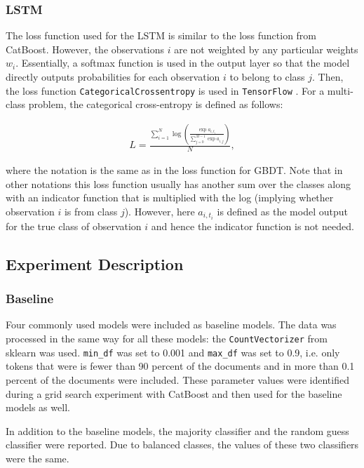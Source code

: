 \documentclass{article}
\begin{document}
	\subsubsection{LSTM}
	
	The loss function used for the LSTM is similar to the loss function from CatBoost. However, the observations $i$ are not weighted by any particular weights $w_i$. Essentially, a softmax function is used in the output layer so that the model directly outputs probabilities for each observation $i$ to belong to class $j$. Then, the loss function \lstinline{CategoricalCrossentropy} is used in \lstinline{TensorFlow} \cite{noauthor_module:_nodate}. For a multi-class problem, the categorical cross-entropy is defined as follows:
	
	\begin{align}
	L = \frac{\sum_{i = 1}^N \log \left(\frac{\exp a_{i, t_i}}{\sum_{j = 0}^{M-1} \exp a_{i, j}}\right)}{N}, 
	\end{align}
	
	where the notation is the same as in the loss function for GBDT. Note that in other notations this loss function usually has another sum over the classes along with an indicator function that is multiplied with the log (implying whether observation $i$ is from class $j$). However, here $a_{i, t_i}$ is defined as the model output for the true class of observation $i$ and hence the indicator function is not needed.
	
	\subsection{Experiment Description}
	
	\subsubsection{Baseline}
	
	Four commonly used models were included as baseline models. The data was processed in the same way for all these models: the \lstinline{CountVectorizer} from sklearn was used. \lstinline{min_df} was set to 0.001 and \lstinline{max_df} was set to 0.9, i.e. only tokens that were is fewer than 90 percent of the documents and in more than 0.1 percent of the documents were included. These parameter values were identified during a grid search experiment with CatBoost and then used for the baseline models as well.
	
	In addition to the baseline models, the majority classifier and the random guess classifier were reported. Due to balanced classes, the values of these two classifiers were the same.
	
\end{document}
